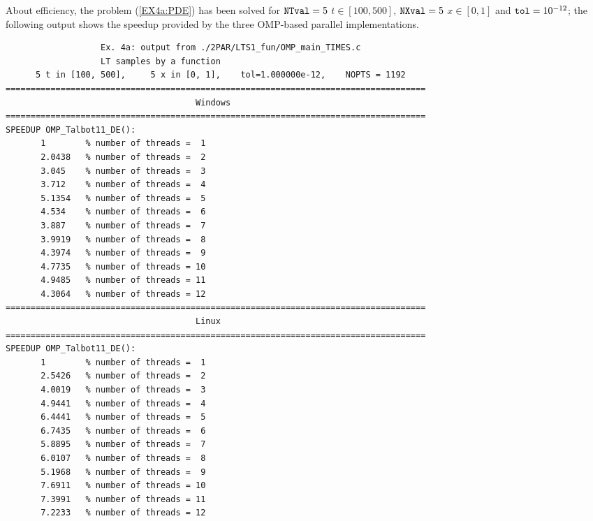 \documentclass[a4paper,10pt]{report}%
\begin{document}
About efficiency, the problem (\ref{EX4a:PDE}) has been solved for ${\tt NTval}=5$ $t\in[100, 500]$,
${\tt NXval}=5$ $x\in[0,1]$ and ${\tt tol}=10^{-12}$; the following output shows the speedup provided by
the three OMP-based parallel implementations.
\begin{lstlisting}
                   Ex. 4a: output from ./2PAR/LTS1_fun/OMP_main_TIMES.c
                   LT samples by a function
      5 t in [100, 500],     5 x in [0, 1],    tol=1.000000e-12,    NOPTS = 1192
====================================================================================
                                      Windows
====================================================================================
SPEEDUP OMP_Talbot11_DE():
       1        % number of threads =  1
       2.0438   % number of threads =  2
       3.045    % number of threads =  3
       3.712    % number of threads =  4
       5.1354   % number of threads =  5
       4.534    % number of threads =  6
       3.887    % number of threads =  7
       3.9919   % number of threads =  8
       4.3974   % number of threads =  9
       4.7735   % number of threads = 10
       4.9485   % number of threads = 11
       4.3064   % number of threads = 12
====================================================================================
                                      Linux
====================================================================================
SPEEDUP OMP_Talbot11_DE():
       1        % number of threads =  1
       2.5426   % number of threads =  2
       4.0019   % number of threads =  3
       4.9441   % number of threads =  4
       6.4441   % number of threads =  5
       6.7435   % number of threads =  6
       5.8895   % number of threads =  7
       6.0107   % number of threads =  8
       5.1968   % number of threads =  9
       7.6911   % number of threads = 10
       7.3991   % number of threads = 11
       7.2233   % number of threads = 12


\end{lstlisting}
\end{document}
